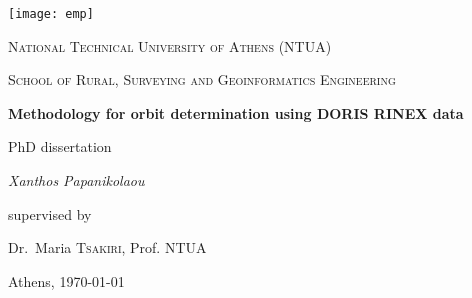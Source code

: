 \begin{titlepage}
  \centering
  \texttt{[image: emp]}\par\vspace{1cm}
  {\Large \textsc{National Technical University of Athens (NTUA)} \par}
  {\Large \textsc{School of Rural, Surveying and Geoinformatics Engineering} \par}
  \vspace{.5cm}
  {\huge\bfseries Methodology for orbit determination using DORIS RINEX data \par}
  \vspace{2cm}
  {\large PhD dissertation}\\
  \vspace{.15cm}
  {\Large\itshape Xanthos Papanikolaou\par}
  \vfill
  supervised by\par
  Dr.~Maria \textsc{Tsakiri}, Prof. NTUA
  \vfill
  {\large Athens, \today\par}
\end{titlepage}
